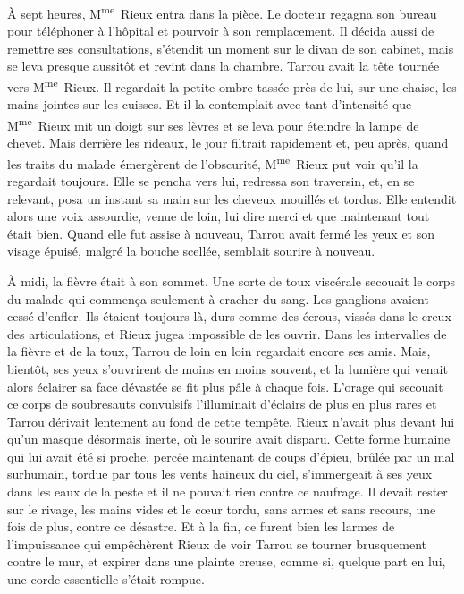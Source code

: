 \documentclass[french,twoside]{book} %
\begin{document}
À sept heures, M\textsuperscript{me} Rieux entra dans la pièce. Le docteur regagna son bureau pour téléphoner à l’hôpital et pourvoir à son remplacement. Il décida aussi de remettre ses consultations, s’étendit un moment sur le divan de son cabinet, mais se leva presque aussitôt et revint dans la chambre. Tarrou avait la tête tournée vers M\textsuperscript{me} Rieux. Il regardait la petite ombre tassée près de lui, sur une chaise, les mains jointes sur les cuisses. Et il la contemplait avec tant d’intensité que M\textsuperscript{me} Rieux mit un doigt sur ses lèvres et se leva pour éteindre la lampe de chevet. Mais derrière les rideaux, le jour filtrait rapidement et, peu après, quand les traits du malade émergèrent de l’obscurité, M\textsuperscript{me} Rieux put voir qu’il la regardait toujours. Elle se pencha vers lui, redressa son traversin, et, en se relevant, posa un instant sa main sur les cheveux mouillés et tordus. Elle entendit alors une voix assourdie, venue de loin, lui dire merci et que maintenant tout était bien. Quand elle fut assise à nouveau, Tarrou avait fermé les yeux et son visage épuisé, malgré la bouche scellée, semblait sourire à nouveau.\par
À midi, la fièvre était à son sommet. Une sorte de toux viscérale secouait le corps du malade qui commença seulement à cracher du sang. Les ganglions avaient cessé d’enfler. Ils étaient toujours là, durs comme des écrous, vissés dans le creux des articulations, et Rieux jugea impossible de les ouvrir. Dans les intervalles de la fièvre et de la toux, Tarrou de loin en loin regardait encore ses amis. Mais, bientôt, ses yeux s’ouvrirent de moins en moins souvent, et la lumière qui venait alors éclairer sa face dévastée se fit plus pâle à chaque fois. L’orage qui secouait ce corps de soubresauts convulsifs l’illuminait d’éclairs de plus en plus rares et Tarrou dérivait lentement au fond de cette tempête. Rieux n’avait plus devant lui qu’un masque désormais inerte, où le sourire avait disparu. Cette forme humaine qui lui avait été si proche, percée maintenant de coups d’épieu, brûlée par un mal surhumain, tordue par tous les vents haineux du ciel, s’immergeait à ses yeux dans les eaux de la peste et il ne pouvait rien contre ce naufrage. Il devait rester sur le rivage, les mains vides et le cœur tordu, sans armes et sans recours, une fois de plus, contre ce désastre. Et à la fin, ce furent bien les larmes de l’impuissance qui empêchèrent Rieux de voir Tarrou se tourner brusquement contre le mur, et expirer dans une plainte creuse, comme si, quelque part en lui, une corde essentielle s’était rompue.\par
\end{document}
